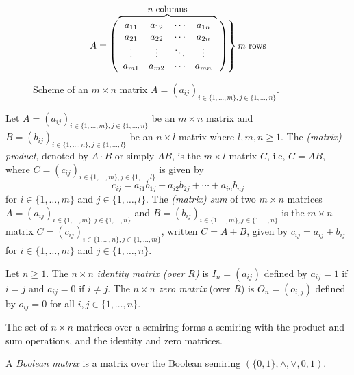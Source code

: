 \begin{figure}[ht]
\centering 
\def\matriximg{%
	\begin{array}{cccc}
		a_{11} & a_{12} & \cdots & a_{1n}\\
		a_{21} & a_{22} & \cdots & a_{2n}\\
		\vdots & \vdots & \ddots & \vdots\\
		a_{m1} & a_{m2} & \cdots & a_{mn}\\
	\end{array}
}%
\[
A = \left(\vphantom{\matriximg}\right.\kern-2\nulldelimiterspace
\overbrace{\matriximg}^{\text{\small{$n$ columns}}}\kern-\nulldelimiterspace\left.\left.\vphantom{\matriximg}\right)\right\}\text{\small{$m$ rows}}
\]
\caption[Scheme of an $m\times n$ matrix]{Scheme of an $m \times n$ matrix $A = (a_{ij})_{i\in \{1,\ldots,m\}, j\in \{1,\ldots,n\}}$.}
\label{prelim:sync_max:matrixscheme}
\end{figure}

Let $A = (a_{ij})_{i \in \{1,\ldots, m\}, j \in \{1,\ldots, n\}}$ 
be an  $m \times n$ matrix
and 
$B = (b_{ij})_{i \in \{1,\ldots,n\}, j \in \{1,\ldots,l\}}$ 
be an $n \times l$ matrix where $l,m,n \ge 1$.
The \emph{(matrix) product}, denoted by $A\cdot B$ or simply $AB$,
is the $m \times l$ matrix $C$, i.e, $C = AB$, where $C = (c_{ij})_{i\in \{1,\ldots, m\}, j \in \{1,\ldots,l\}}$ is given by
\[
c_{ij} = a_{i1}b_{1j} + a_{i2}b_{2j} + \cdots + a_{in}b_{nj} %
\]
for $i \in \{1,\ldots,m\}$ and $j \in \{1,\ldots, l\}$. The \emph{(matrix) sum} 
of two $m \times n$ matrices  
$A = (a_{ij})_{i \in \{1,\ldots, m\}, j \in \{1,\ldots, n\}}$ 
and
$B = (b_{ij})_{i \in \{1,\ldots, m\}, j \in \{1,\ldots, n\}}$ 
is the $m \times n$
matrix  $C = (c_{ij})_{i\in \{1,\ldots,n\}, j \in \{1,\ldots,m\}}$, written
$C = A + B$, given by $c_{ij} = a_{ij} + b_{ij}$ for $i \in \{1,\ldots,m\}$ and $j \in \{1,\ldots,n\}$.

   
Let $n \ge 1$.
The $n \times n$ \emph{identity matrix (over $R$)} 
is $I_n = (a_{ij})$ defined
by $a_{ij} = 1$ if $i = j$ and $a_{ij} = 0$ if $i \ne j$. \label{def:identitymtx}
The $n \times n$ \emph{zero matrix} (over $R$) is $O_n = (o_{i,j})$ \label{def:zeromtx} 
defined by $o_{ij} = 0$ for all $i,j \in \{1,\ldots,n\}$.

The set of $n \times n$ matrices over a semiring forms a semiring
with the product and sum operations, and the identity and zero matrices.

A \emph{Boolean matrix} %
is a matrix %
over the Boolean semiring $(\{0,1\}, \land, \lor, 0, 1)$.

